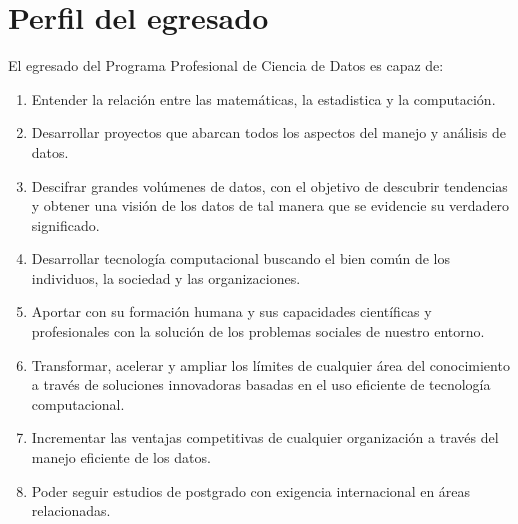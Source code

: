 \section{Perfil del egresado}

El egresado del Programa Profesional de Ciencia de Datos es capaz de:
\begin{enumerate}
\item Entender la relación entre las matemáticas, la estadistica y la computación.
\item Desarrollar proyectos que abarcan todos los aspectos del manejo y análisis de datos.
\item Descifrar grandes volúmenes de datos, con el objetivo de descubrir tendencias y obtener una visión de los datos de tal manera que se evidencie su verdadero significado.
\item Desarrollar tecnologí­a computacional buscando el bien común de los individuos, la sociedad y las organizaciones.
\item Aportar con su formación humana y sus capacidades cientí­ficas y profesionales con la solución de los problemas sociales de nuestro entorno.
\item Transformar, acelerar y ampliar los lí­mites de cualquier área del conocimiento a través de soluciones innovadoras basadas en el uso eficiente de tecnologí­a computacional.
\item Incrementar las ventajas competitivas de cualquier organización a través del manejo eficiente de los datos.
\item Poder seguir estudios de postgrado con exigencia internacional en áreas relacionadas.
\end{enumerate}
